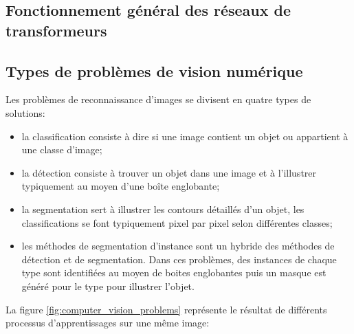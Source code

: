   \subsection{Fonctionnement général des réseaux de transformeurs}

  \subsection{Types de problèmes de vision numérique}
    Les problèmes de reconnaissance d'images se divisent en quatre types de solutions: 
    \begin{itemize}
        \item la classification consiste à dire si une image contient un objet ou appartient à une classe d'image; 
        \item la détection consiste à trouver un objet dans une image et à l'illustrer typiquement au moyen d'une boîte englobante;
        \item la segmentation sert à illustrer les contours détaillés d'un objet, les classifications se font typiquement pixel par pixel selon différentes classes;
        \item les méthodes de segmentation d'instance sont un hybride des méthodes de détection et de segmentation. Dans ces problèmes, des instances de chaque type sont identifiées au moyen de boites englobantes puis un masque est généré pour le type pour illustrer l'objet.
    \end{itemize}
    La figure \ref{fig:computer_vision_problems} représente le résultat de différents processus d'apprentissages sur une même image:

